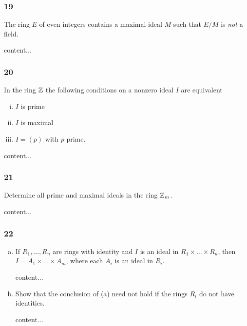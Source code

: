 \subsubsection*{19}
\begin{graybox}
	The ring $E$ of even integers contains a maximal ideal $M$ such that $E / M$ is \textit{not} a field.
\end{graybox}
\begin{solution}
	content...
\end{solution}

\subsubsection*{20}
\begin{graybox}
	In the ring $\mathbb{Z}$ the following conditions on a nonzero ideal $I$ are equivalent
	\begin{enumerate}[(i)]
		\item $I$ is prime
		\item $I$ is maximal
		\item $I = (p)$ with $p$ prime. 
	\end{enumerate}
\end{graybox}
\begin{solution}
	content...
\end{solution}

\subsubsection*{21}
\begin{graybox}
	Determine all prime and maximal ideals in the ring $\mathbb{Z}_m$.
\end{graybox}
\begin{solution}
	content...
\end{solution}

\subsubsection*{22}
\begin{enumerate}[(a)]
	\item 
	\begin{graybox}
		If $R_1,\dots,R_n$ are rings with identity and $I$ is an ideal in $R_1 \times \dots \times R_n$, then $I = A_1 \times \dots \times A_m$, where each $A_i$ is an ideal in $R_i$.
	\end{graybox}
	\begin{solution}
		content...
	\end{solution}
	
	\item
	\begin{graybox}
		Show that the conclusion of (a) need not hold if the rings $R_i$ do not have identities.
	\end{graybox}
	\begin{solution}
		content...
	\end{solution}
\end{enumerate}

